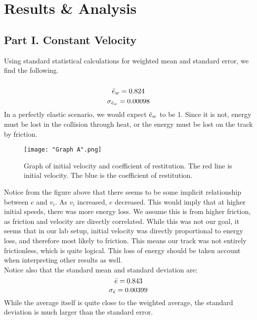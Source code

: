 \documentclass[journal,transmag]{IEEEtran}
\begin{document}
\section{Results \& Analysis}
\begin{center}
    \subsection{Part I. Constant Velocity}
\end{center} 
Using standard statistical calculations for weighted mean and standard error, we find the following.\\
\\
\begin{equation}
    \Bar{e}_w = 0.824
\end{equation}
\begin{equation}
        \sigma_{\Bar{e}_w} = 0.00098
\end{equation}
\indent In a perfectly elastic scenario, we would expect $ \Bar{e}_w$ to be 1. Since it is not, energy must be lost in the collision through heat, or the energy must be lost on the track by friction.\\
\begin{figure}[h]
\caption{Graph of initial velocity and coefficient of restitution. The red line is initial velocity. The blue is the coefficient of restitution.}
\centering
\texttt{[image: "Graph A".png]}
\end{figure}
\indent Notice from the figure above that there seems to be some implicit relationship between $e$ and $v_i$. As $v_i$ increased, $e$ decreased. This would imply that at higher initial speeds, there was more energy loss. We assume this is from higher friction, as friction and velocity are directly correlated. While this was not our goal, it seems that in our lab setup, initial velocity was directly proportional to energy loss, and therefore most likely to friction. This means our track was not entirely frictionless, which is quite logical. This loss of energy should be taken account when interpreting other results as well.
\\
\indent Notice also that the standard mean and standard deviation are:
\begin{equation}
    \Bar{e} = 0.843
\end{equation}
\begin{equation}
    \sigma_{\Bar{e}} = 0.00399
\end{equation}
While the average itself is quite close to the weighted average, the standard deviation is much larger than the standard error.\\
\end{document}
